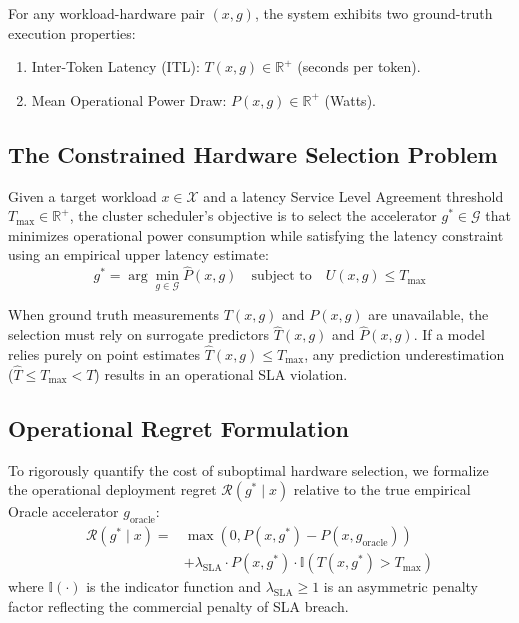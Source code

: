 \documentclass[preprint,12pt]{elsarticle}
\begin{document}
For any workload-hardware pair $(x, g)$, the system exhibits two ground-truth execution properties:
\begin{enumerate}
    \item Inter-Token Latency (ITL): $T(x, g) \in \mathbb{R}^+$ (seconds per token).
    \item Mean Operational Power Draw: $P(x, g) \in \mathbb{R}^+$ (Watts).
\end{enumerate}

\subsection{The Constrained Hardware Selection Problem}
Given a target workload $x \in \mathcal{X}$ and a latency Service Level Agreement threshold $T_{\max} \in \mathbb{R}^+$, the cluster scheduler's objective is to select the accelerator $g^* \in \mathcal{G}$ that minimizes operational power consumption while satisfying the latency constraint using an empirical upper latency estimate:
\begin{equation}
\label{eq:opt_problem}
g^* = \arg\min_{g \in \mathcal{G}} \hat P(x, g) \quad \text{subject to} \quad U(x,g) \le T_{\max}
\end{equation}

When ground truth measurements $T(x, g)$ and $P(x, g)$ are unavailable, the selection must rely on surrogate predictors $\hat{T}(x, g)$ and $\hat{P}(x, g)$. If a model relies purely on point estimates $\hat{T}(x, g) \le T_{\max}$, any prediction underestimation ($\hat{T} \le T_{\max} < T$) results in an operational SLA violation. 

\subsection{Operational Regret Formulation}
To rigorously quantify the cost of suboptimal hardware selection, we formalize the operational deployment regret $\mathcal{R}(g^* \mid x)$ relative to the true empirical Oracle accelerator $g_{\text{oracle}}$:
\begin{equation}
\label{eq:regret}
\begin{aligned}\mathcal{R}(g^* \mid x) ={}& \max\left(0, P(x, g^*) - P(x, g_{\text{oracle}})\right) \\ &+ \lambda_{\text{SLA}} \cdot P(x, g^*) \cdot \mathbb{I}\left(T(x, g^*) > T_{\max}\right)
\end{aligned}
\end{equation}
where $\mathbb{I}(\cdot)$ is the indicator function and $\lambda_{\text{SLA}} \ge 1$ is an asymmetric penalty factor reflecting the commercial penalty of SLA breach.
\end{document}
